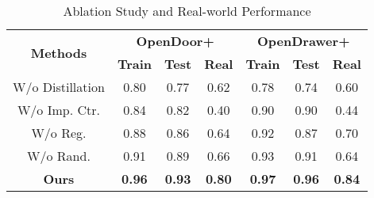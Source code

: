 \begin{table}[]
\centering
\begin{tabular}{c c c c c c c}
\multicolumn{1}{c}{\multirow{2}{*}{\textbf{Methods}}} & \multicolumn{3}{c}{\textbf{OpenDoor+}} & \multicolumn{3}{c}{\textbf{OpenDrawer+}} \\ \cline{2-7} 
                 & \textbf{Train} & \textbf{Test} & \textbf{Real} & \textbf{Train} & \textbf{Test} & \textbf{Real}\\ \hline
W/o Distillation & 0.80 & 0.77 & 0.62 & 0.78 & 0.74 & 0.60 \\ 
W/o Imp. Ctr. & 0.84 & 0.82 & 0.40 & 0.90 & 0.90 & 0.44 \\ 
W/o Reg. & 0.88 & 0.86 & 0.64 & 0.92 & 0.87 & 0.70 \\ 
W/o Rand. & 0.91 & 0.89 & 0.66 & 0.93 & 0.91 & 0.64 \\ \hline
\textbf{Ours} & \textbf{0.96} & \textbf{0.93} & \textbf{0.80} & \textbf{0.97} & \textbf{0.96} & \textbf{0.84} \\ 
\end{tabular}
\caption{Ablation Study and Real-world Performance}
\label{table:ablation}
\end{table}
